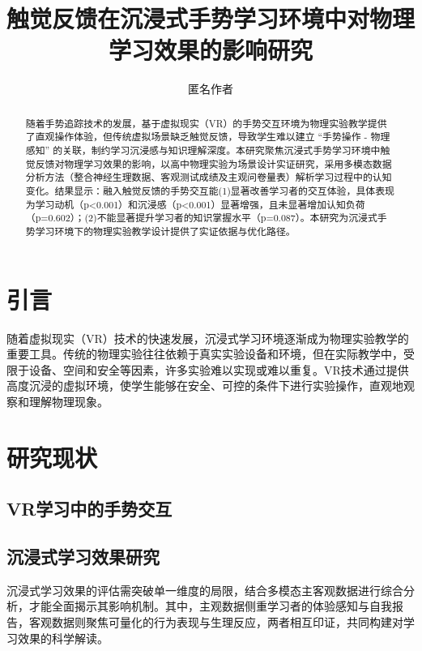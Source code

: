 \documentclass[runningheads]{llncs}
\begin{document}
\title{触觉反馈在沉浸式手势学习环境中对物理学习效果的影响研究}

\author{匿名作者}

\maketitle

\begin{abstract}
  随着手势追踪技术的发展，基于虚拟现实（VR）的手势交互环境为物理实验教学提供了直观操作体验，但传统虚拟场景缺乏触觉反馈，导致学生难以建立 “手势操作 - 物理感知” 的关联，制约学习沉浸感与知识理解深度。本研究聚焦沉浸式手势学习环境中触觉反馈对物理学习效果的影响，以高中物理实验为场景设计实证研究，采用多模态数据分析方法（整合神经生理数据、客观测试成绩及主观问卷量表）解析学习过程中的认知变化。结果显示：融入触觉反馈的手势交互能(1)显著改善学习者的交互体验，具体表现为学习动机（p<0.001）和沉浸感（p<0.001）显著增强，且未显著增加认知负荷（p=0.602）；(2)不能显著提升学习者的知识掌握水平（p=0.087）。本研究为沉浸式手势学习环境下的物理实验教学设计提供了实证依据与优化路径。

\end{abstract}
 
\section{引言}
随着虚拟现实（VR）技术的快速发展，沉浸式学习环境逐渐成为物理实验教学的重要工具。传统的物理实验往往依赖于真实实验设备和环境，但在实际教学中，受限于设备、空间和安全等因素，许多实验难以实现或难以重复。VR技术通过提供高度沉浸的虚拟环境，使学生能够在安全、可控的条件下进行实验操作，直观地观察和理解物理现象。



\section{研究现状}
\subsection{VR学习中的手势交互} 

\subsection{沉浸式学习效果研究}
沉浸式学习效果的评估需突破单一维度的局限，结合多模态主客观数据进行综合分析，才能全面揭示其影响机制。其中，主观数据侧重学习者的体验感知与自我报告，客观数据则聚焦可量化的行为表现与生理反应，两者相互印证，共同构建对学习效果的科学解读。
\end{document}
